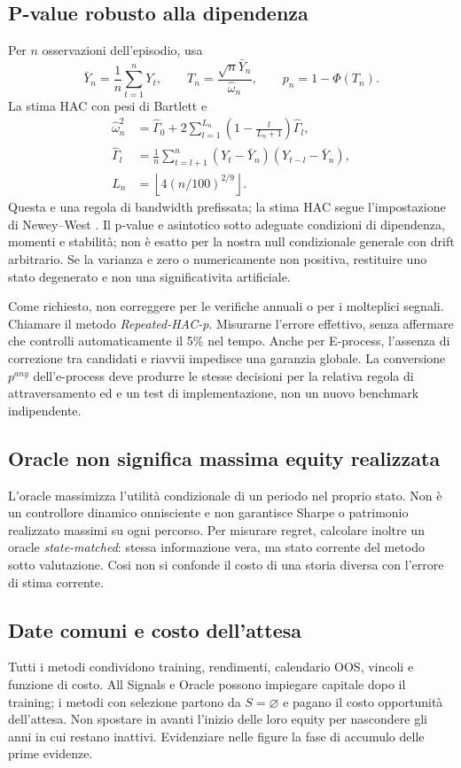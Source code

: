 \documentclass[11pt,a4paper]{article}
\theoremstyle{definition}\newtheorem{definition}[theorem]{Definizione}
\theoremstyle{remark}\newtheorem{remark}[theorem]{Osservazione}
\begin{document}
\subsection{P-value robusto alla dipendenza}
Per $n$ osservazioni dell'episodio, usa
\begin{equation}
 \bar Y_n=\frac1n\sum_{t=1}^nY_t,\qquad
 T_n=\frac{\sqrt n\bar Y_n}{\widehat\omega_n},\qquad p_n=1-\Phi(T_n).
\end{equation}
La stima HAC con pesi di Bartlett e
\begin{align}
 \widehat\omega_n^2&=\widehat\Gamma_0+
 2\sum_{l=1}^{L_n}\left(1-\frac{l}{L_n+1}\right)\widehat\Gamma_l,\\
 \widehat\Gamma_l&=\frac1n\sum_{t=l+1}^n(Y_t-\bar Y_n)(Y_{t-l}-\bar Y_n),\\
 L_n&=\left\lfloor4(n/100)^{2/9}\right\rfloor.
\end{align}
Questa e una regola di bandwidth prefissata; la stima HAC segue l'impostazione di Newey--West \cite{nw}. Il p-value e asintotico sotto adeguate condizioni di dipendenza, momenti e stabilità; non è esatto per la nostra null condizionale generale con drift arbitrario. Se la varianza e zero o numericamente non positiva, restituire uno stato degenerato e non una significativita artificiale.

Come richiesto, non correggere per le verifiche annuali o per i molteplici segnali. Chiamare il metodo \emph{Repeated-HAC-p}. Misurarne l'errore effettivo, senza affermare che controlli automaticamente il 5\% nel tempo. Anche per E-process, l'assenza di correzione tra candidati e riavvii impedisce una garanzia globale. La conversione $p^{any}$ dell'e-process deve produrre le stesse decisioni per la relativa regola di attraversamento ed e un test di implementazione, non un nuovo benchmark indipendente.

\subsection{Oracle non significa massima equity realizzata}
L'oracle massimizza l'utilità condizionale di un periodo nel proprio stato. Non è un controllore dinamico onnisciente e non garantisce Sharpe o patrimonio realizzato massimi su ogni percorso. Per misurare regret, calcolare inoltre un oracle \emph{state-matched}: stessa informazione vera, ma stato corrente del metodo sotto valutazione. Cosi non si confonde il costo di una storia diversa con l'errore di stima corrente.

\subsection{Date comuni e costo dell'attesa}
Tutti i metodi condividono training, rendimenti, calendario OOS, vincoli e funzione di costo. All Signals e Oracle possono impiegare capitale dopo il training; i metodi con selezione partono da $S=\varnothing$ e pagano il costo opportunità dell'attesa. Non spostare in avanti l'inizio delle loro equity per nascondere gli anni in cui restano inattivi. Evidenziare nelle figure la fase di accumulo delle prime evidenze.
\end{document}
